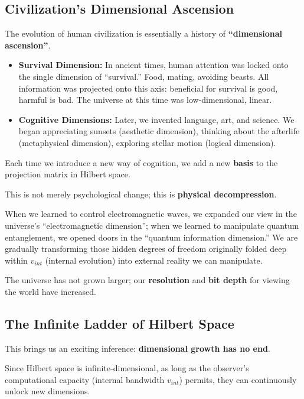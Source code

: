 \subsection{Civilization's Dimensional Ascension}

The evolution of human civilization is essentially a history of \textbf{``dimensional ascension''}.

\begin{itemize}
\item \textbf{Survival Dimension:} In ancient times, human attention was locked onto the single dimension of ``survival.'' Food, mating, avoiding beasts. All information was projected onto this axis: beneficial for survival is good, harmful is bad. The universe at this time was low-dimensional, linear.

\item \textbf{Cognitive Dimensions:} Later, we invented language, art, and science. We began appreciating sunsets (aesthetic dimension), thinking about the afterlife (metaphysical dimension), exploring stellar motion (logical dimension).
\end{itemize}

Each time we introduce a new way of cognition, we add a new \textbf{basis} to the projection matrix in Hilbert space.

This is not merely psychological change; this is \textbf{physical decompression}.

When we learned to control electromagnetic waves, we expanded our view in the universe's ``electromagnetic dimension''; when we learned to manipulate quantum entanglement, we opened doors in the ``quantum information dimension.'' We are gradually transforming those hidden degrees of freedom originally folded deep within $v_{int}$ (internal evolution) into external reality we can manipulate.

The universe has not grown larger; our \textbf{resolution} and \textbf{bit depth} for viewing the world have increased.

\subsection{The Infinite Ladder of Hilbert Space}

This brings us an exciting inference: \textbf{dimensional growth has no end}.

Since Hilbert space is infinite-dimensional, as long as the observer's computational capacity (internal bandwidth $v_{int}$) permits, they can continuously unlock new dimensions.

